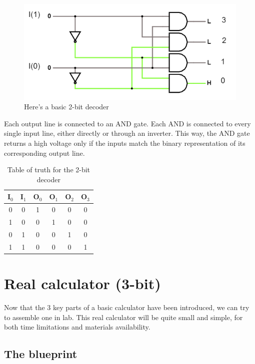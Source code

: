 \documentclass{article}
\begin{document}
\begin{figure}[h]
  \centering
  \includegraphics[scale=0.7]{basic_decoder}
  \caption{Here's a basic 2-bit decoder}
  \label{basic_decoder}
\end{figure}

Each output line is connected to an AND gate. Each AND is connected to every single input line, either directly or through an inverter. This way, the AND gate returns a high voltage only if the inputs match the binary representation of its corresponding output line.

\begin{table}[h]
  \centering
  \begin{tabular}{| c | c || c | c | c | c |}
  \hline
  I$_0$ & I$_1$ & O$_0$ & O$_1$ & O$_2$ & O$_3$ \\ \hline
  0 & 0 & 1 & 0 & 0 & 0 \\ \hline
  1 & 0 & 0 & 1 & 0 & 0 \\ \hline
  0 & 1 & 0 & 0 & 1 & 0 \\ \hline
  1 & 1 & 0 & 0 & 0 & 1 \\ \hline
  \end{tabular}
  \caption{Table of truth for the 2-bit decoder}
  \label{Table_basic_decoder}
\end{table}

\clearpage

\section{Real calculator (3-bit)}

Now that the 3 key parts of a basic calculator have been introduced, we can try to assemble one in lab. This real calculator will be quite small and simple, for both time limitations and materials availability. 

\subsection{The blueprint}
\end{document}
